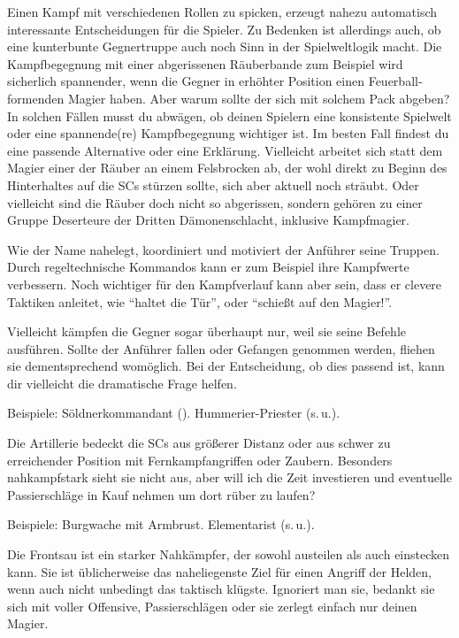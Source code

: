 Einen Kampf mit verschiedenen Rollen zu spicken, erzeugt nahezu automatisch interessante Entscheidungen für die Spieler.
Zu Bedenken ist allerdings auch, ob eine kunterbunte Gegnertruppe auch noch Sinn in der Spielweltlogik macht.
Die Kampfbegegnung mit einer abgerissenen Räuberbande zum Beispiel wird sicherlich spannender, wenn die Gegner in erhöhter Position einen Feuerball-formenden Magier haben.
Aber warum sollte der sich mit solchem Pack abgeben?
In solchen Fällen musst du abwägen, ob deinen Spielern eine konsistente Spielwelt oder eine spannende(re) Kampfbegegnung wichtiger ist. 
Im besten Fall findest du eine passende Alternative oder eine Erklärung.
Vielleicht arbeitet sich statt dem Magier einer der Räuber an einem Felsbrocken ab, der wohl direkt zu Beginn des Hinterhaltes auf die SCs stürzen sollte, sich aber aktuell noch sträubt.
Oder vielleicht sind die Räuber doch nicht so abgerissen, sondern gehören zu einer Gruppe Deserteure der Dritten Dämonenschlacht, inklusive Kampfmagier.

Wie der Name nahelegt, koordiniert und motiviert der Anführer seine Truppen.
Durch regeltechnische Kommandos kann er zum Beispiel ihre Kampfwerte verbessern.
Noch wichtiger für den Kampfverlauf kann aber sein, dass er clevere Taktiken anleitet, wie \enquote{haltet die Tür}, oder \enquote{schießt auf den Magier!}.

Vielleicht kämpfen die Gegner sogar überhaupt nur, weil sie seine Befehle ausführen.
Sollte der Anführer fallen oder Gefangen genommen werden, fliehen sie dementsprechend womöglich.
Bei der Entscheidung, ob dies passend ist, kann dir vielleicht die dramatische Frage helfen.

Beispiele: Söldnerkommandant (). Hummerier-Priester (s.\,u.).

Die Artillerie bedeckt die SCs aus größerer Distanz oder aus schwer zu erreichender Position mit Fernkampfangriffen oder Zaubern.
Besonders nahkampfstark sieht sie nicht aus, aber will ich die Zeit investieren und eventuelle Passierschläge in Kauf nehmen um dort rüber zu laufen?

Beispiele: Burgwache mit Armbrust. Elementarist (s.\,u.).





Die Frontsau ist ein starker Nahkämpfer, der sowohl austeilen als auch einstecken kann.
Sie ist üblicherweise das naheliegenste Ziel für einen Angriff der Helden, wenn auch nicht unbedingt das taktisch klügste.
Ignoriert man sie, bedankt sie sich mit voller Offensive, Passierschlägen oder sie zerlegt einfach nur deinen Magier.

